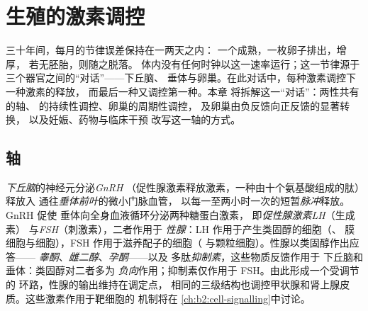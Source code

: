 \chapter{生殖的激素调控}\label{ch:b2:reproductive-hormones}

三十年间，每月的节律误差保持在一两天之内：
一个成熟，一枚卵子排出，增厚，
若无胚胎，则随之脱落。
体内没有任何时钟以这一速率运行；这一节律源于
三个器官之间的“对话”——下丘脑、
垂体与卵巢。在此对话中，每种激素调控下一种激素的释放，
而最后一种又调控第一种。本章
将拆解这一“对话”：两性共有的轴、
的持续性调控、卵巢的周期性调控，
及卵巢由负反馈向正反馈的显著转换，
以及妊娠、药物与临床干预
改写这一轴的方式。

\section{轴}

\begin{definition}\label{def:b2:reproductive-hormones:axis}
\emph{下丘脑}的神经元分泌\emph{GnRH}
（促性腺激素释放激素，一种由十个氨基酸组成的肽）释放入
通往\emph{垂体前叶}的微小门脉血管，
以每一至两小时一次的短暂\emph{脉冲}释放。GnRH 促使
垂体向全身血液循环分泌两种糖蛋白激素，
即\emph{促性腺激素}\emph{LH}（生成素）
与\emph{FSH}（刺激素），二者作用于
\emph{性腺}：LH 作用于产生类固醇的细胞（、
膜细胞与细胞），FSH 作用于滋养配子的细胞（
与颗粒细胞）。性腺以类固醇作出应答——
\emph{睾酮}、\emph{雌二醇}、\emph{孕酮}——以及
多肽\emph{抑制素}，这些物质反馈作用于
下丘脑和垂体：类固醇对二者多为
\emph{负向}作用；抑制素仅作用于 FSH。由此形成一个受调节的
环路，性腺的输出维持在调定点，
相同的三级结构也调控甲状腺和肾上腺皮质。这些激素作用于靶细胞的
机制将在
\cref{ch:b2:cell-signalling}中讨论。
\end{definition}

